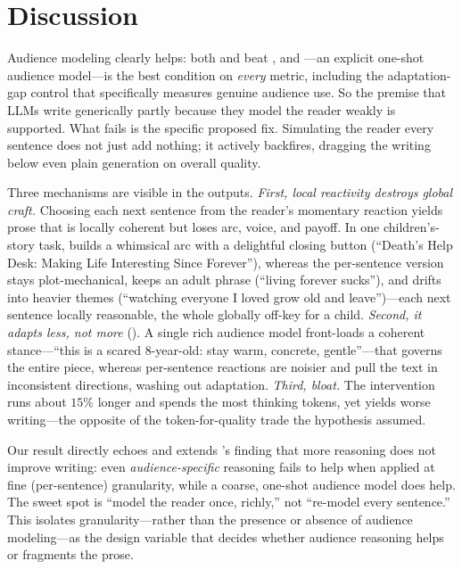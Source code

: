 \section{Discussion}
\label{sec:discussion}

 Audience modeling clearly
helps: both \cot and \simtom beat \plain, and \simtom---an explicit one-shot audience model---is
the best condition on \emph{every} metric, including the adaptation-gap control that specifically
measures genuine audience use. So the premise that LLMs write generically partly because they
model the reader weakly is supported. What fails is the specific proposed fix. Simulating the
reader every sentence does not just add nothing; it actively backfires, dragging the writing below
even plain generation on overall quality.

 Three mechanisms are visible in the outputs.
\emph{First, local reactivity destroys global craft.} Choosing each next sentence from the
reader's momentary reaction yields prose that is locally coherent but loses arc, voice, and payoff.
In one children's-story task, \simtom builds a whimsical arc with a delightful closing button
(``Death's Help Desk: Making Life Interesting Since Forever''), whereas the per-sentence version
stays plot-mechanical, keeps an adult phrase (``living forever sucks''), and drifts into heavier
themes (``watching everyone I loved grow old and leave'')---each next sentence locally reasonable,
the whole globally off-key for a child. \emph{Second, it adapts less, not more}
(). A single rich audience model front-loads a coherent stance---``this is a
scared 8-year-old: stay warm, concrete, gentle''---that governs the entire piece, whereas
per-sentence reactions are noisier and pull the text in inconsistent directions, washing out
adaptation. \emph{Third, bloat.} The intervention runs about $15\%$ longer and spends the most
thinking tokens, yet yields worse writing---the opposite of the token-for-quality trade the
hypothesis assumed.

 Our result directly echoes and extends
\citet{chakrabarty2025aislop}'s finding that more reasoning does not improve writing: even
\emph{audience-specific} reasoning fails to help when applied at fine (per-sentence) granularity,
while a coarse, one-shot audience model does help. The sweet spot is ``model the reader once,
richly,'' not ``re-model every sentence.'' This isolates granularity---rather than the presence or
absence of audience modeling---as the design variable that decides whether audience reasoning
helps or fragments the prose.

